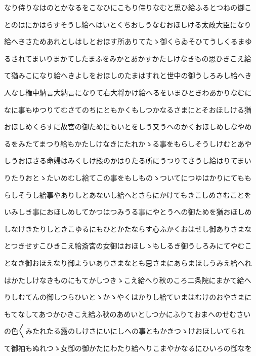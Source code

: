 \documentclass[a4paper,11pt,landscape]{ltjtarticle}
\begin{document}
なり侍りなはのとかなるをこなひにこもり侍りなむと思ひ給ふるとつねの御こ
\par\medskip
とのはにかはらすそうし給へはいとくちおしうなむおほしける太政大臣になり
\par\medskip
給へきさためあれとしはしとおほす所ありてたゝ御くらゐそひてうしくるまゆ
\par\medskip
るされてまいりまかてしたまふをみかとあかすかたしけなきもの思ひきこえ給
\par\medskip
て猶みこになり給へきよしをおほしのたまはすれと世中の御うしろみし給へき
\par\medskip
人なし権中納言大納言になりて右大将かけ給へるをいまひときわあかりなむに
\par\medskip
なに事もゆつりてむさてのちにともかくもしつかなるさまにとそおほしける猶
\par\medskip
おほしめくらすに故宮の御ためにもいとをしう又うへのかくおほしめしなやめ
\par\medskip
るをみたてまつり給もかたしけなきにたれかゝる事をもらしそうしけむとあや
\par\medskip
しうおほさる命婦はみくしけ殿のかはりたる所にうつりてさうし給はりてまい
\par\medskip
りたりおとゝたいめむし給てこの事をもしものゝついてにつゆはかりにてもも
\par\medskip
らしそうし給事やありしとあないし給へとさらにかけてもきこしめさむことを
\par\medskip
いみしき事におほしめしてかつはつみうる事にやとうへの御ためを猶おほしめ
\par\medskip
しなけきたりしときこゆるにもひとかたならす心ふかくおはせし御ありさまな
\par\medskip
とつきせすこひきこえ給斎宮の女御はおほしゝもしるき御うしろみにてやむこ
\par\medskip
となき御おほえなり御よういありさまなとも思さまにあらまほしうみえ給へれ
\par\medskip
はかたしけなきものにもてかしつきゝこえ給へり秋のころ二条院にまかて給へ
\par\medskip
りしむてんの御しつらひいとゝかゝやくはかりし給ていまはむけのおやさまに
\par\medskip
もてなしてあつかひきこえ給ふ秋のあめいとしつかにふりておまへのせむさい
\par\medskip
の色〱みたれたる露のしけさにいにしへの事ともかきつゝけおほしいてられ
\par\medskip
て御袖もぬれつゝ女御の御かたにわたり給へりこまやかなるにひいろの御なを
\par\medskip
\end{document}
